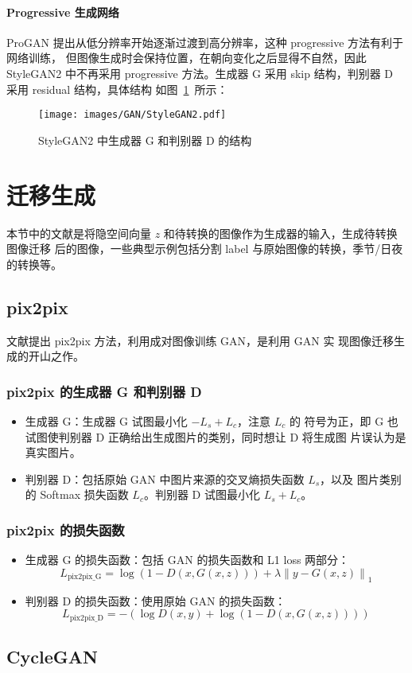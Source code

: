 \paragraph{Progressive 生成网络}
ProGAN 提出从低分辨率开始逐渐过渡到高分辨率，这种 progressive 方法有利于网络训练，
但图像生成时会保持位置，在朝向变化之后显得不自然，因此 StyleGAN2 中不再采用
progressive 方法。生成器 G 采用 skip 结构，判别器 D 采用 residual 结构，具体结构
如图~\ref{fig:stylegan2}~所示：

\begin{figure}[ht]
  \centering
  \texttt{[image: images/GAN/StyleGAN2.pdf]}
  \caption{StyleGAN2 中生成器 G 和判别器 D 的结构}\label{fig:stylegan2}
\end{figure}

\section{迁移生成}
本节中的文献是将隐空间向量 $z$ 和待转换的图像作为生成器的输入，生成待转换图像迁移
后的图像，一些典型示例包括分割 label 与原始图像的转换，季节/日夜的转换等。

\subsection{pix2pix}
文献提出 pix2pix 方法，利用成对图像训练 GAN，是利用 GAN 实
现图像迁移生成的开山之作。

\subsubsection{pix2pix 的生成器 G 和判别器 D}
\begin{itemize}
  \item 生成器 G：生成器 G 试图最小化 $-L_{s} + L_{c}$，注意 $L_{c}$ 的
    符号为正，即 G 也试图使判别器 D 正确给出生成图片的类别，同时想让 D 将生成图
    片误认为是真实图片。
  \item 判别器 D：包括原始 GAN 中图片来源的交叉熵损失函数 $L_{s}$，以及
    图片类别的 Softmax 损失函数 $L_{c}$。判别器 D 试图最小化 $L_{s} + L_{c}$。
\end{itemize}

\subsubsection{pix2pix 的损失函数}
\begin{itemize}
  \item 生成器 G 的损失函数：包括 GAN 的损失函数和 L1 loss 两部分：
    \begin{equation}
      L_{\mathrm{pix2pix\_G}} = \log(1 - D(x, G(x, z))) + \lambda \left\| y - G(x, z) \right\|_1
    \end{equation}
  \item 判别器 D 的损失函数：使用原始 GAN 的损失函数：
    \begin{equation}
      L_{\mathrm{pix2pix\_D}} = -(\log D(x, y) + \log(1 - D(x, G(x, z))))
    \end{equation}
\end{itemize}

\subsection{CycleGAN}

